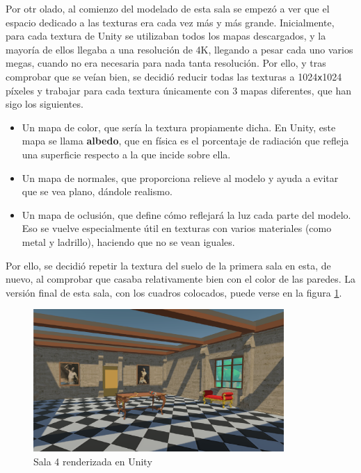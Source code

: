 Por otr olado, al comienzo del modelado de esta sala se empezó a ver que el espacio dedicado a las texturas era cada vez más y más grande. Inicialmente, para cada textura de Unity se utilizaban todos los mapas descargados, y la mayoría de ellos llegaba a una resolución de 4K, llegando a pesar cada uno varios megas, cuando no era necesaria para nada tanta resolución. Por ello, y tras comprobar que se veían bien, se decidió reducir todas las texturas a 1024\texttt{x}1024 píxeles y trabajar para cada textura únicamente con 3 mapas diferentes, que han sigo los siguientes.

\begin{itemize}
    \item Un mapa de color, que sería la textura propiamente dicha. En Unity, este mapa se llama \textbf{albedo}, que en física es el porcentaje de radiación que refleja una superficie respecto a la que incide sobre ella.
    \item Un mapa de normales, que proporciona relieve al modelo y ayuda a evitar que se vea plano, dándole realismo.
    \item Un mapa de oclusión, que define cómo reflejará la luz cada parte del modelo. Eso se vuelve especialmente útil en texturas con varios materiales (como metal y ladrillo), haciendo que no se vean iguales.
\end{itemize}

Por ello, se decidió repetir la textura del suelo de la primera sala en esta, de nuevo, al comprobar que casaba relativamente bien con el color de las paredes. La versión final de esta sala, con los cuadros colocados, puede verse en la figura \ref{fig:unity-sala-4}.

\begin{figure}[!h]
\begin{center}
\includegraphics[width=0.85\textwidth]{imagenes/7/salas-unity/unity-sala-4.png}
\caption{Sala 4 renderizada en Unity}
\label{fig:unity-sala-4}
\end{center}
\end{figure}

